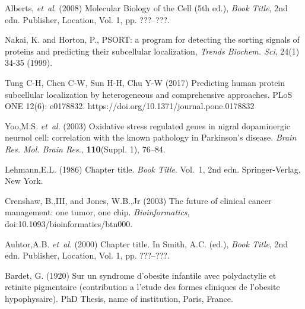 \documentclass{bioinfo}
\begin{document}
%
%
%
%
%
%
%
%
%


\begin{thebibliography}{}

Alberts, \textit{et~al}. (2008) Molecular Biology of the Cell
(5th ed.), \textit{Book Title}, 2nd edn. Publisher, Location, Vol. 1, pp.
???--???.

Nakai, K. and Horton, P., PSORT: a program for detecting the sorting signals of proteins and predicting their subcellular localization, \textit{Trends Biochem. Sci}, 24(1) 34-35 (1999).

Tung C-H, Chen C-W, Sun H-H, Chu Y-W (2017) Predicting human protein subcellular localization by heterogeneous and comprehensive approaches. PLoS ONE 12(6): e0178832. https://doi.org/10.1371/journal.pone.0178832

Yoo,M.S. \textit{et~al}. (2003) Oxidative stress regulated genes
in nigral dopaminergic neurnol cell: correlation with the known
pathology in Parkinson's disease. \textit{Brain Res. Mol. Brain
Res.}, \textbf{110}(Suppl. 1), 76--84.

Lehmann,E.L. (1986) Chapter title. \textit{Book Title}. Vol.~1, 2nd edn. Springer-Verlag, New York.

Crenshaw, B.,III, and Jones, W.B.,Jr (2003) The future of clinical
cancer management: one tumor, one chip. \textit{Bioinformatics},
doi:10.1093/bioinformatics/btn000.

Auhtor,A.B. \textit{et~al}. (2000) Chapter title. In Smith, A.C.
(ed.), \textit{Book Title}, 2nd edn. Publisher, Location, Vol. 1, pp.
???--???.

Bardet, G. (1920) Sur un syndrome d'obesite infantile avec
polydactylie et retinite pigmentaire (contribution a l'etude des
formes cliniques de l'obesite hypophysaire). PhD Thesis, name of
institution, Paris, France.

\end{thebibliography}
\end{document}
